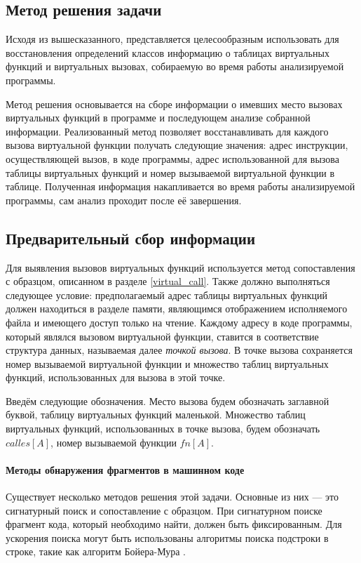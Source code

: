 \documentclass[a4paper,12pt,russian]{article}
\begin{document}
\subsection{Метод решения задачи}
Исходя из вышесказанного, представляется целесообразным использовать для восстановления определений классов информацию о таблицах виртуальных функций и виртуальных вызовах, собираемую во время работы анализируемой программы.

Метод решения основывается на сборе информации о имевших место вызовах виртуальных функций в программе и последующем анализе собранной информации.
Реализованный метод позволяет восстанавливать для каждого вызова виртуальной функции получать следующие значения: адрес инструкции, осуществляющей вызов, в коде программы, адрес использованной для вызова таблицы виртуальных функций и номер вызываемой виртуальной функции в таблице.
Полученная информация накапливается во время работы анализируемой программы, сам анализ проходит после её завершения.

\subsection{Предварительный сбор информации}
Для выявления вызовов виртуальных функций используется метод сопоставления с образцом, описанном в разделе \ref{virtual_call}.
Также должно выполняться следующее условие: предполагаемый адрес таблицы виртуальных функций должен находиться в разделе памяти, являющимся отображением исполняемого файла и имеющего доступ только на чтение.
Каждому адресу в коде программы, который являлся вызовом виртуальной функции, ставится в соответствие структура данных, называемая далее \emph{точкой вызова}.
В точке вызова сохраняется номер вызываемой виртуальной функции и множество таблиц виртуальных функций, использованных для вызова в этой точке.

Введём следующие обозначения.
Место вызова будем обозначать заглавной буквой, таблицу виртуальных функций маленькой.
Множество таблиц виртуальных функций, использованных в точке вызова, будем обозначать $calles[A]$, номер вызываемой функции $fn[A]$.
\paragraph{Методы обнаружения фрагментов в машинном коде}
Существует нес\-колько методов решения этой задачи.
Основные из них --- это сигнатурный поиск и сопоставление с образцом.
При сигнатурном поиске фрагмент кода, который необходимо найти, должен быть фиксированным.
Для ускорения поиска могут быть использованы алгоритмы поиска подстроки в строке, такие как алгоритм Бойера-Мура \cite{corman}.
\end{document}
